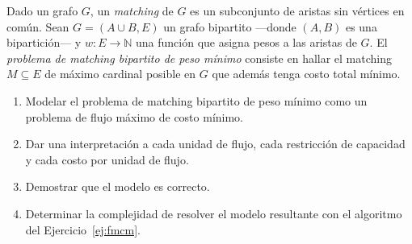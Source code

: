 

\item Dado un grafo $G$, un \emph{matching} de $G$ es un subconjunto de aristas sin vértices en común. Sean $G = (A \cup B, E)$ un grafo bipartito ---donde $(A,B)$ es una bipartición--- y $w: E \rightarrow \mathbb N$ una función que asigna pesos a las aristas de $G$. El \emph{problema de matching bipartito de peso mínimo} consiste en hallar el matching $M \subseteq E$ de máximo cardinal posible en $G$ que además tenga costo total mínimo.
\begin{enumerate}[label=$\alph*)$,ref=$\alph*)$]
 \item Modelar el problema de matching bipartito de peso mínimo como un problema de flujo máximo de costo mínimo.
 \item Dar una interpretación a cada unidad de flujo, cada restricción de capacidad y cada costo por unidad de flujo.
 \item Demostrar que el modelo es correcto.
 \item Determinar la complejidad de resolver el modelo resultante con el algoritmo del Ejercicio~\ref{ej:fmcm}.
\end{enumerate} \label{ej:matching}


